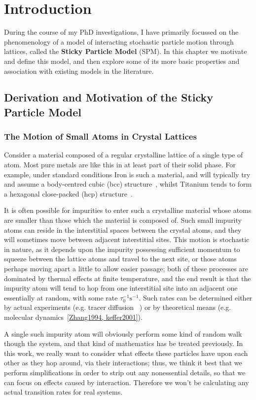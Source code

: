 \chapter{Introduction}
During the course of my PhD investigations, I have primarily focussed on the phenomenology of a model of
interacting stochastic particle motion through lattices, called the \textbf{Sticky Particle Model} (SPM). In
this chapter we motivate and define this model, and then explore some of its more basic properties and
association with existing models in the literature.

\section{Derivation and Motivation of the Sticky Particle Model}
\subsection{The Motion of Small Atoms in Crystal Lattices}
Consider a material composed of a regular crystalline lattice of a single type of atom. Most pure metals
are like this in at least part of their solid phase. For example, under standard conditions Iron is such
a material, and will typically try and assume a body-centred cubic (bcc) structure~\cite{Villars2016}, whilst Titanium tends to
form a hexagonal close-packed (hcp) structure~\cite{Patterson1925}.

It is often possible for impurities to enter such a crystalline material whose atoms are smaller than those
which the material is composed of. Such small impurity atoms can reside in the interstitial spaces between 
the crystal atoms, and they will sometimes move between adjacent interstitial sites. This motion is
stochastic in nature, as it depends upon the impurity possessing sufficient momentum to squeeze between
the lattice atoms and travel to the next site, or those atoms perhaps moving apart a little to allow easier
passage; both of these processes are dominated by thermal effects at finite temperature, and the end result
is that the impurity atom will tend to hop from one interstitial site into an
adjacent one essentially at random, with some rate $\tau_0 ^{-1} \mathrm{s}^{-1}$.
Such rates can be determined either by actual experiments (e.g. tracer diffusion
~\cite{Lamb1946, Wersin2004}) or by theoretical means
(e.g. molecular dynamics~\ref{Zhang1994, keffer2001}).

A single such impurity atom will obviously perform some kind of random walk though the system, and that kind
of mathematics has be treated previously. In this work, we really want to consider what effects these
particles have upon each other as they hop around, via their interactions; thus, we think it best that we
perform simplifications in order to strip out any nonessential details, so that we can focus on effects 
caused by interaction. Therefore we won't be calculating any actual transition rates for real systems.

